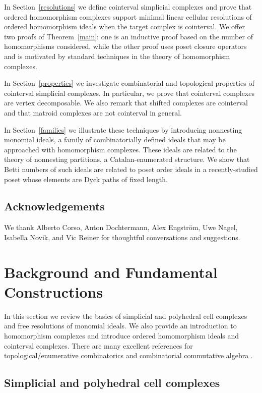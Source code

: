 \documentclass[11pt]{amsart}
\theoremstyle{definition}
\numberwithin{equation}{section}
\theoremstyle{remark}
\numberwithin{equation}{section}
\begin{document}
In Section~\ref{resolutions} we define cointerval simplicial complexes and prove that ordered homomorphism complexes support minimal linear cellular resolutions of ordered homomorphism ideals when the target complex is cointerval.
We offer two proofs of Theorem~\ref{main}: one is an inductive proof based on the number of homomorphisms considered, while the other proof uses poset closure operators and is motivated by standard techniques in the theory of homomorphism complexes.

In Section~\ref{properties} we investigate combinatorial and topological properties of cointerval simplicial complexes.  
In particular, we prove that cointerval complexes are vertex decomposable.
We also remark that shifted complexes are cointerval and that matroid complexes are not cointerval in general.

In Section~\ref{families} we illustrate these techniques by introducing nonnesting monomial ideals, a family of combinatorially defined ideals that may be approached with homomorphism complexes.
These ideals are related to the theory of nonnesting partitions, a Catalan-enumerated structure.
We show that Betti numbers of such ideals are related to poset order ideals in a recently-studied poset whose elements are Dyck paths of fixed length.

\subsection{Acknowledgements}

We thank Alberto Corso, Anton Dochtermann, Alex Engstr\"{o}m, Uwe Nagel, Isabella Novik, and Vic Reiner for thoughtful conversations and suggestions.

\section{Background and Fundamental Constructions}\label{background}

In this section we review the basics of simplicial and polyhedral cell complexes and free resolutions of monomial ideals.
We also provide an introduction to homomorphism complexes and introduce ordered homomorphism ideals and cointerval complexes.
There are many excellent references for topological/enumerative combinatorics and combinatorial commutative algebra \cite{BjornerSurvey,KozlovBook,MillerSturmfels,StanleyVol1,StanleyVol2}.

\subsection{Simplicial and polyhedral cell complexes}
\end{document}
